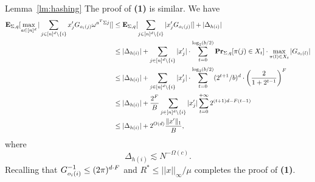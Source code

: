 \begin{proofof}{Lemma~\ref{lm:hashing}}
The proof of {\bf (1)} is similar. We  have
\begin{equation}
\begin{split}
\expect_{\Sigma, q}[\max_{a\in \nsq}  |\sum_{j \in \nsq\setminus \{i\}} x'_j G_{o_i(j)} \omega^{a^T\Sigma j}|] &\leq \expect_{\Sigma, q}[\sum_{j \in \nsq\setminus \{i\}} |x'_j G_{o_i(j)}|]+|\Delta_{h(i)}|\\
&\leq |\Delta_{h(i)}|+\sum_{j\in \nsq\setminus \{i\}}  \abs{x'_j} \cdot \sum_{t=0}^{\log_2 (b/2)} \prob_{\Sigma, q}[\pi(j)\in X_t]\cdot \max_{\pi(l)\in X_t} |G_{o_i(l)}|\\
&\leq |\Delta_{h(i)}|+\sum_{j\in \nsq\setminus \{i\}}  \abs{x'_j} \cdot \sum_{t=0}^{\log_2 (b/2)} (2^{t+1}/b)^{d}\cdot \left(\frac{2}{1+2^{t-1}}\right)^{\fc}\\
&\leq |\Delta_{h(i)}|+\frac{2^\fc}{B}\sum_{j\in \nsq\setminus \{i\}} \abs{x'_j} \sum_{t=0}^{+\infty}  2^{(t+1)d-\fc (t-1)}\\
& \leq |\Delta_{h(i)}|+2^{O(d)} \frac{\norm{1}{x'}}{B},\\
\end{split}
\end{equation}
where 
\begin{equation*}
\Delta_{h(i)} \lesssim N^{-\Omega(c)}.
\end{equation*}
Recalling that $G_{o_i(i)}^{-1}\leq \GS$ and  $R^*\leq ||x||_\infty/\mu$ 
completes the proof of {\bf (1)}.




\end{proofof}

